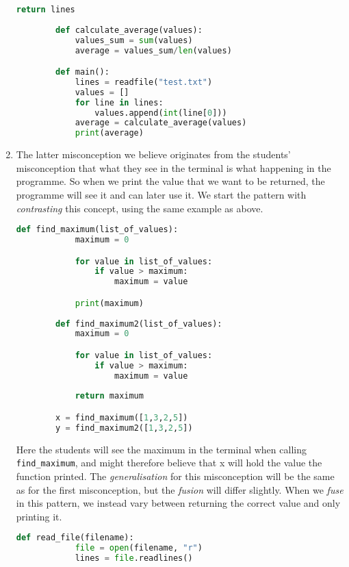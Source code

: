 \begin{enumerate}
\begin{lstlisting}[language=Python]
            return lines
            
        def calculate_average(values):
            values_sum = sum(values)
            average = values_sum/len(values)

        def main():
            lines = readfile("test.txt")
            values = []
            for line in lines:
                values.append(int(line[0]))
            average = calculate_average(values)
            print(average)
    \end{lstlisting}

    \item The latter misconception we believe originates from the students' 
misconception that what they see in the terminal is what happening in 
the programme. So when we print the value that we want to be returned, 
the programme will see it and can later use it. We start the pattern 
with \emph{contrasting} this concept, using the same example as above.

     \begin{lstlisting}[language=Python]
        def find_maximum(list_of_values):
            maximum = 0

            for value in list_of_values:
                if value > maximum:
                    maximum = value

            print(maximum)
            
        def find_maximum2(list_of_values):
            maximum = 0

            for value in list_of_values:
                if value > maximum:
                    maximum = value
                    
            return maximum

        x = find_maximum([1,3,2,5])
        y = find_maximum2([1,3,2,5])
    \end{lstlisting}

    Here the students will see the maximum in the terminal when calling 
\texttt{find_maximum}, and might therefore believe that x 
will hold the value the function printed. The \emph{generalisation} for 
this misconception will be the same as for the first misconception, but 
the \emph{fusion} will differ slightly. When we \emph{fuse} in this 
pattern, we instead vary between returning the correct value and only 
printing it.

     \begin{lstlisting}[language=Python]
        def read_file(filename):
            file = open(filename, "r")
            lines = file.readlines()


\end{lstlisting}
\end{enumerate}
